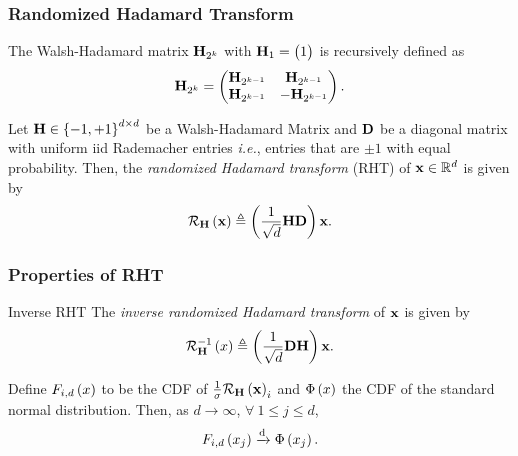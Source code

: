 \documentclass{beamer}
\begin{document}
    \begin{frame}
        \frametitle{Randomized Hadamard Transform}
        \begin{definition}
            The Walsh-Hadamard matrix \(\boldsymbol{\mathbf{H}}_{2^k}\) with \(\boldsymbol{\mathbf{H}}_1 = 
            \begin{pmatrix}1\end{pmatrix}\) is recursively defined as
            \begin{equation}
                \boldsymbol{\mathbf{H}}_{2^k} = \begin{pmatrix}\boldsymbol{\mathbf{H}}_{2^{k-1}} & \boldsymbol{\mathbf{H}}_{2^{k-1}} \\ \boldsymbol{\mathbf{H}}_{2^{k-1}} & -\boldsymbol{\mathbf{H}}_{2^{k-1}}\end{pmatrix}.
                \label{eq:Hl-def}
            \end{equation}
        \end{definition}
        \begin{definition}
            Let \(\boldsymbol{\mathbf{H}}\in\left\{-1,+1\right\}^{d\times d}\) be a Walsh-Hadamard 
            Matrix and \(\boldsymbol{\mathbf{D}}\) be a diagonal matrix with uniform iid 
            Rademacher entries \emph{i.e.}, entries that are \(\pm 1\) with 
            equal probability. Then, the \emph{randomized Hadamard transform} 
            (RHT) of \(\boldsymbol{\mathbf{x}}\in\mathbb R^d\) is given by
            \begin{equation}
                \mathcal R_{\boldsymbol{\mathbf{H}}}\left(\boldsymbol{\mathbf{x}}\right) \triangleq \left(\frac{1}{\sqrt{d}}\boldsymbol{\mathbf{HD}}\right)\boldsymbol{\mathbf{x}}.
                \label{eq:rht-def}
            \end{equation}
        \end{definition}
    \end{frame}

    \begin{frame}
        \frametitle{Properties of RHT}
        \begin{definition}{Inverse RHT}
            The \emph{inverse randomized Hadamard transform} of \(\boldsymbol{\mathbf{x}}\) is given by
            \begin{equation}
                \mathcal R_{\boldsymbol{\mathbf{H}}}^{-1}\left(x\right) \triangleq \left(\frac{1}{\sqrt{d}}\boldsymbol{\mathbf{DH}}\right)\boldsymbol{\mathbf{x}}.
                \label{eq:inv-rht-def}
            \end{equation}
        \end{definition}
        \begin{lemma}
            \label{lem:rht-norm-conv}
            Define \(F_{i,d}\left(x\right)\) to be the CDF of 
            \(\frac{1}{\sigma}\mathcal R_{\boldsymbol{\mathbf{H}}}\left(\boldsymbol{\mathbf{x}}\right)_i\) and 
            \(\Phi\left(x\right)\) the CDF of the standard normal distribution.
            Then, as \(d\to\infty\), \(\forall\ 1 \le j \le d\), 
            \begin{equation}
                F_{i,d}\left(x_j\right) \xrightarrow{\mathrm{d}} \Phi\left(x_j\right).
                \label{eq:rht-norm-conv}
            \end{equation}
        \end{lemma}
    \end{frame}
\end{document}
